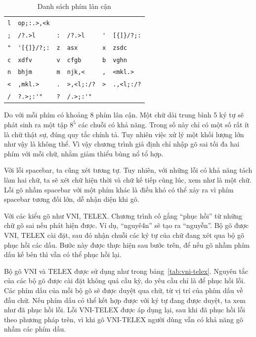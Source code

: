 \documentclass[a4paper,oneside,14pt]{extbook} %
\begin{document}
\begin{table}[htbp]
\begin{tabular}{ll|ll|ll}
\verb#l#&\verb#op;:.>,<k#\\
\verb#;#&\verb#/?.>l#&%
\verb#:#&\verb#/?.>l#&%
\verb#'#&\verb#[{]}/?;:#\\
\verb#"#&\verb#'[{]}/?;:#&%
\verb#z#&\verb#asx#&%
\verb#x#&\verb#zsdc#\\
\verb#c#&\verb#xdfv#&%
\verb#v#&\verb#cfgb#&%
\verb#b#&\verb#vghn#\\
\verb#n#&\verb#bhjm#&%
\verb#m#&\verb#njk,<#&%
\verb#,#&\verb#<mkl.>#\\
\verb#<#&\verb#,mkl.>#&%
\verb#.#&\verb#>,<l;:/?#&%
\verb#>#&\verb#.,<l;:/?#\\
\verb#/#&\verb#?.>;:'"#&%
\verb#?#&\verb#/.>;:'"#&%
\end{tabular}
  \caption{Danh sách phím lân cận}
  \label{tab:neighbor-keys}
\end{table}


Do với mỗi phím có khoảng 8 phím lân cận. Một chữ dài trung bình 5 ký
tự sẽ phát sinh ra một tập $8^5$ các chuỗi có khả năng. Trong số này
chỉ có một số rất ít là chữ thật sự, đúng quy tắc chính tả. Tuy nhiên
việc xử lý một khối lượng lớn như vậy là không thể. Vì vậy chương
trình giả định chỉ nhập gõ sai tối đa hai phím với mỗi chữ, nhằm giảm
thiểu bùng nổ tổ hợp.

Với lỗi spacebar, ta cũng xét tương tự. Tuy nhiên, với những lỗi có
khả năng tách làm hai chữ, ta sẽ xét chữ hiện thời và chữ kế tiếp cùng
lúc, xem như là một chữ. Lỗi gõ nhầm spacebar với một phím khác là
điều khó có thể xảy ra vì phím spacebar tương đối lớn, dễ nhận diện
khi gõ.

Với các kiểu gõ như VNI, TELEX. Chương trình cố gắng ``phục hồi'' từ
những chữ gõ sai nếu phát hiện được. Ví dụ, ``nguyê4n'' sẽ tạo ra
``nguyễn''. Bộ gõ được  VNI, TELEX cài đặt, sau đó nhận chuỗi các ký tự
của chữ đang xét qua bộ gõ phục hồi các dấu. Bước này được thực hiện
sau bước trên, để nếu gõ nhầm phím dấu kế bên thì vẫn có thể phục hồi
lại.

Bộ gõ VNI và TELEX được sử dụng như trong
bảng~\ref{tab:vni-telex}. Nguyên tắc của các bộ gõ được cài đặt không
quá cầu kỳ, do yêu cầu chỉ là để phục hồi lỗi. Các phím dấu của mỗi bộ
gõ sẽ được duyệt qua chữ, từ vị trí của phím dấu về đầu chữ. Nếu phím
dấu có thể kết hợp được với ký tự đang được duyệt, ta xem như đã phục
hồi lỗi. Lỗi VNI-TELEX được áp dụng lại, sau khi đã phục hồi lỗi theo
phương pháp trên, vì khi gõ VNI-TELEX người dùng vẫn có khả năng gõ
nhầm các phím dấu.
\end{document}

